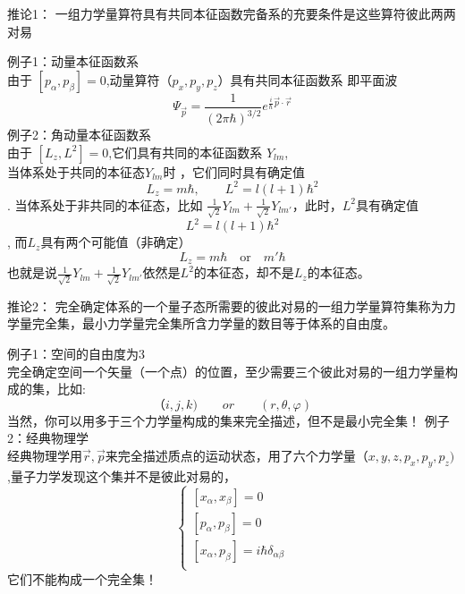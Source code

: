 \begin{frame} [allowframebreaks=]
    \begin{tcolorbox1}{推论1：}
        一组力学量算符具有共同本征函数完备系的充要条件是这些算符彼此两两对易
    \end{tcolorbox1}
    \alert{例子1：动量本征函数系} \\
    由于 $[p_\alpha,p_\beta]=0$,动量算符（$p_x, p_y, p_z$）具有共同本征函数系 即平面波\\
    $$ \Psi_{\vec p}= \frac{1}{(2\pi\hbar)^{3/2}} e^{\frac{i}{\hbar}\vec{p}\cdot\vec{r}}$$ 
    \alert{例子2：角动量本征函数系} \\
    由于 $[L_z,L^2]=0$,它们具有共同的本征函数系 {$Y_{lm}$},\\
    当体系处于共同的本征态$Y_{lm}$时 ，它们同时具有确定值
    $$L_z= m\hbar, \qquad L^2=l(l+1)\hbar ^2 $$.
    当体系处于非共同的本征态，比如 $\frac{1}{\sqrt{2}}Y_{lm} + \frac{1}{\sqrt{2}}Y_{lm'}$，此时，$L^2$具有确定值
    $$L^2=l(l+1)\hbar ^2 $$,
    而$L_z$具有两个可能值（非确定）
    $$L_z= m\hbar\quad \text{or} \quad m'\hbar$$
    也就是说$\frac{1}{\sqrt{2}}Y_{lm} + \frac{1}{\sqrt{2}}Y_{lm'}$依然是$L^2$的本征态，却不是$L_z$的本征态。
\end{frame} 

\begin{frame} [allowframebreaks=]
    \begin{tcolorbox1}{推论2：}
        完全确定体系的一个量子态所需要的彼此对易的一组力学量算符集称为力学量完全集，最小力学量完全集所含力学量的数目等于体系的自由度。
    \end{tcolorbox1}
    \alert{例子1：空间的自由度为3} \\
    完全确定空间一个矢量（一个点）的位置，至少需要三个彼此对易的一组力学量构成的集，比如: $$（i,j,k) \qquad or \qquad (r,\theta,\varphi) $$
    当然，你可以用多于三个力学量构成的集来完全描述，但不是最小完全集！
    \alert{例子2：经典物理学} \\
    经典物理学用$\vec{r}, \vec{p}$来完全描述质点的运动状态，用了六个力学量$（x,y,z, p_x, p_y, p_z)$,量子力学发现这个集并不是彼此对易的，
    $$\begin{cases}
        [x_\alpha,x_\beta]= 0  \\ 
        [p_\alpha,p_\beta]= 0  \\ 
        [x_\alpha,p_\beta]= i\hbar \delta_{\alpha\beta}  \\ 
    \end{cases}$$
    它们不能构成一个完全集！
\end{frame} 

